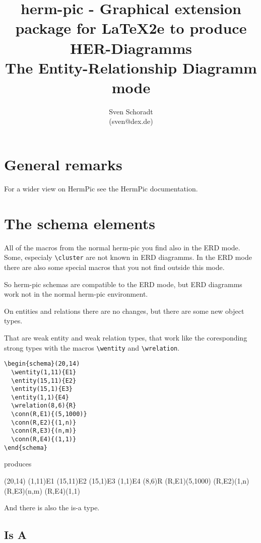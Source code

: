 \documentclass[a4paper,11pt]{article}
\author{Sven Schoradt \\ (sven@dex.de)}
\title{herm-pic - Graphical extension package for LaTeX2e to produce 
       HER-Diagramms\\The Entity-Relationship Diagramm mode}
\begin{document}
\maketitle

\section{General remarks}

For a wider view on HermPic see the HermPic documentation.

\section{The schema elements}

All of the macros from the normal herm-pic you find also in the ERD mode.
Some, especialy \verb|\cluster| are not known in ERD diagramms. In the 
ERD mode there are also some special macros that you not find outside this mode.

So herm-pic schemas are compatible to the ERD mode, but ERD diagramms work not 
in the normal herm-pic environment.

On entities and relations there are no changes, but there are some new 
object types.

That are weak entity and weak relation types, that work like the coresponding 
strong types with the macros \verb|\wentity| and \verb|\wrelation|.

\begin{verbatim}
\begin{schema}(20,14)
  \wentity(1,11){E1}
  \entity(15,11){E2}
  \entity(15,1){E3}
  \entity(1,1){E4}
  \wrelation(8,6){R}
  \conn(R,E1){(5,1000)}
  \conn(R,E2){(1,n)}
  \conn(R,E3){(n,m)}
  \conn(R,E4){(1,1)}
\end{schema}
\end{verbatim}

produces

\begin{schema}(20,14)
  \wentity(1,11){E1}
  \entity(15,11){E2}
  \entity(15,1){E3}
  \entity(1,1){E4}
  \wrelation(8,6){R}
  \conn(R,E1){(5,1000)}
  \conn(R,E2){(1,n)}
  \conn(R,E3){(n,m)}
  \conn(R,E4){(1,1)}
\end{schema}

And there is also the is-a type. 

\subsection{Is A}
\end{document}
